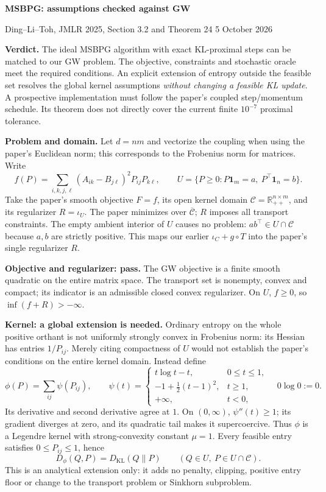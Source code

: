 \documentclass[11pt,a4paper]{article}
\newcommand{\R}{\mathbb R}\newcommand{\one}{\mathbf1}
\newcommand{\KL}{D_{\mathrm{KL}}}
\begin{document}
{\color{ink}\fontsize{16}{19}\selectfont\bfseries MSBPG: assumptions checked against GW\par}
{\small Ding--Li--Toh, JMLR 2025, Section 3.2 and Theorem 24 \hfill 5 October 2026\par}
\vspace{3pt}
\textbf{Verdict.} The ideal MSBPG algorithm with exact KL-proximal steps can be matched to our GW problem. The objective, constraints and stochastic oracle meet the required conditions. An explicit extension of entropy outside the feasible set resolves the global kernel assumptions \emph{without changing a feasible KL update}. A prospective implementation must follow the paper's coupled step/momentum schedule. Its theorem does not directly cover the current finite $10^{-7}$ proximal tolerance.

\textbf{Problem and domain.} Let $d=nm$ and vectorize the coupling when using the paper's Euclidean norm; this corresponds to the Frobenius norm for matrices. Write
\[
 f(P)=\sum_{i,k,j,\ell}(A_{ik}-B_{j\ell})^2P_{ij}P_{k\ell},\qquad
 U=\{P\geq0:P\one_m=a,\ P^\top\one_n=b\}.
\]
Take the paper's smooth objective $F=f$, its open kernel domain $\mathcal C=\R_{++}^{n\times m}$, and its regularizer $R=\iota_U$. The paper minimizes over $\overline{\mathcal C}$; $R$ imposes all transport constraints. The empty ambient interior of $U$ causes no problem: $ab^\top\in U\cap\mathcal C$ because $a,b$ are strictly positive. This maps our earlier $\iota_C+g\circ T$ into the paper's single regularizer $R$.

\textbf{Objective and regularizer: pass.} The GW objective is a finite smooth quadratic on the entire matrix space. The transport set is nonempty, convex and compact; its indicator is an admissible closed convex regularizer. On $U$, $f\geq0$, so $\inf(f+R)>-\infty$.

\textbf{Kernel: a global extension is needed.} Ordinary entropy on the whole positive orthant is not uniformly strongly convex in Frobenius norm: its Hessian has entries $1/P_{ij}$. Merely citing compactness of $U$ would not establish the paper's conditions on the entire kernel domain. Instead define
\[
 \phi(P)=\sum_{ij}\psi(P_{ij}),\qquad
 \psi(t)=\begin{cases}
 t\log t-t,&0\leq t\leq1,\\
 -1+\tfrac12(t-1)^2,&t\geq1,\\
 +\infty,&t<0,
 \end{cases}\quad 0\log0:=0.
\]
Its derivative and second derivative agree at $1$. On $(0,\infty)$,
$\psi''(t)\geq1$; its gradient diverges at zero, and its quadratic tail makes it supercoercive. Thus $\phi$ is a Legendre kernel with strong-convexity constant $\mu=1$. Every feasible entry satisfies $0\leq P_{ij}\leq1$, hence
\[
 D_\phi(Q,P)=\KL(Q\|P)\qquad(Q\in U,\ P\in U\cap\mathcal C).
\]
This is an analytical extension only: it adds no penalty, clipping, positive entry floor or change to the transport problem or Sinkhorn subproblem.
\end{document}
